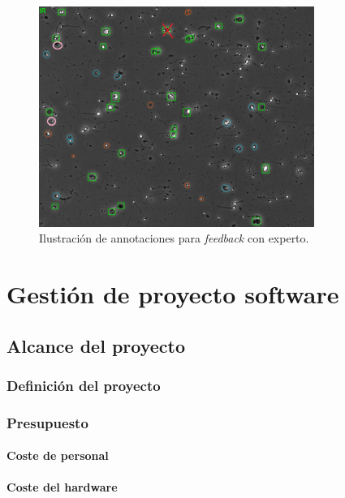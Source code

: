 \documentclass[12pt,a4paper,onecolumn,oneside]{report}
\begin{document}
\begin{figure}[htbp]
  \centering
  \includegraphics[width=0.8\textwidth]{figuras/rounds_cells/feedback_experto.png}
  \caption{Ilustración de annotaciones para \textit{feedback} con experto.}
  \label{fig:feedback_experto}
\end{figure}

\chapter{Gestión de proyecto software} %
\label{Gestión de proyecto software}

\section{Alcance del proyecto}
\label{Alcance del proyecto}

\subsection{Definición del proyecto}

\subsection{Presupuesto}

\subsubsection{Coste de personal}

\subsubsection{Coste del hardware}
\end{document}
